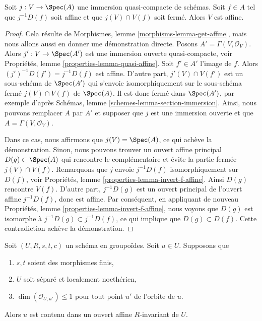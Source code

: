 \begin{lemma}
\label{lemma-get-affine}
Soit $j : V \to \Spec(A)$ une immersion quasi-compacte de schémas.
Soit $f \in A$ tel que $j^{-1}D(f)$ soit affine et que $j(V) \cap V(f)$
soit fermé. Alors $V$ est affine.
\end{lemma}

\begin{proof}
Cela résulte de Morphismes, lemme \ref{morphisms-lemma-get-affine},
mais nous allons aussi en donner une démonstration directe.
Posons $A' = \Gamma(V, \mathcal{O}_V)$. Alors $j' : V \to \Spec(A')$ est une
immersion ouverte quasi-compacte, voir
Propriétés, lemme \ref{properties-lemma-quasi-affine}.
Soit $f' \in A'$ l'image de $f$. Alors $(j')^{-1}D(f') = j^{-1}D(f)$
est affine. D'autre part, $j'(V) \cap V(f')$ est un sous-schéma de
$\Spec(A')$ qui s'envoie isomorphiquement sur le sous-schéma fermé
$j(V) \cap V(f)$ de $\Spec(A)$. Il est donc fermé dans $\Spec(A')$,
par exemple d'après Schémas, lemme \ref{schemes-lemma-section-immersion}.
Ainsi, nous pouvons remplacer $A$ par $A'$ et supposer que $j$ est une immersion ouverte
et que $A = \Gamma(V, \mathcal{O}_V)$.

\medskip\noindent
Dans ce cas, nous affirmons que $j(V) = \Spec(A)$, ce qui achève la démonstration.
Sinon, nous pouvons trouver un ouvert affine principal $D(g) \subset \Spec(A)$
qui rencontre le complémentaire et évite la partie fermée $j(V) \cap V(f)$.
Remarquons que $j$ envoie $j^{-1}D(f)$ isomorphiquement sur $D(f)$, voir
Propriétés, lemme \ref{properties-lemma-invert-f-affine}.
Ainsi $D(g)$ rencontre $V(f)$. D'autre part, $j^{-1}D(g)$
est un ouvert principal de l'ouvert affine $j^{-1}D(f)$, donc est affine.
Par conséquent, en appliquant de nouveau
Propriétés, lemme \ref{properties-lemma-invert-f-affine},
nous voyons que $D(g)$ est isomorphe à $j^{-1}D(g) \subset j^{-1}D(f)$,
ce qui implique que $D(g) \subset D(f)$. Cette contradiction achève
la démonstration.
\end{proof}

\begin{lemma}
\label{lemma-find-affine-codimension-1}
Soit $(U, R, s, t, c)$ un schéma en groupoïdes. Soit $u \in U$. Supposons que
\begin{enumerate}
\item $s, t$ soient des morphismes finis,
\item $U$ soit séparé et localement noethérien,
\item $\dim(\mathcal{O}_{U, u'}) \leq 1$ pour tout point $u'$
de l'orbite de $u$.
\end{enumerate}
Alors $u$ est contenu dans un ouvert affine $R$-invariant de $U$.
\end{lemma}

